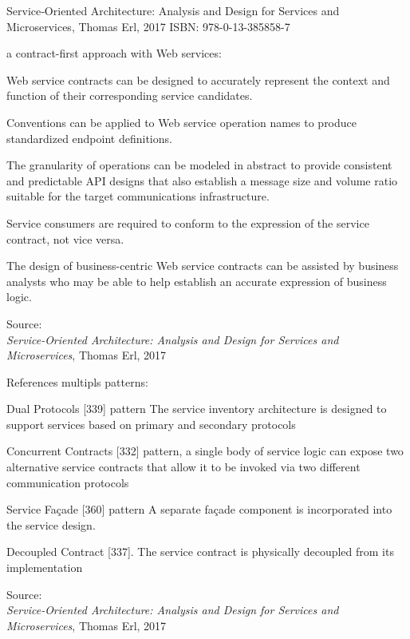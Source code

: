 \documentclass[Screen16to9,17pt]{foils}
\begin{document}
Service‑Oriented Architecture: Analysis and Design for Services and Microservices, Thomas Erl, 2017
ISBN: 978-0-13-385858-7








a contract-first approach with Web services:
\begin{list2}
\item Web service contracts can be designed to accurately represent the context and function of their corresponding service candidates.
\item Conventions can be applied to Web service operation names to produce standardized endpoint definitions.
\item The granularity of operations can be modeled in abstract to provide consistent and predictable API designs that also establish a message size and volume ratio suitable for the target communications infrastructure.
\item Service consumers are required to conform to the expression of the service contract, not vice versa.
\item The design of business-centric Web service contracts can be assisted by business analysts who may be able to help establish an accurate expression of business
logic.
\end{list2}
Source: {\footnotesize\\
\emph{Service‑Oriented Architecture: Analysis and Design for Services and Microservices}, Thomas Erl, 2017}




References multipls patterns:
\begin{list2}
\item Dual Protocols [339] pattern The service inventory architecture is designed to support services based on primary and secondary protocols
\item Concurrent Contracts [332] pattern, a single body of service logic can expose two alternative service contracts that allow it to be invoked via two different communication protocols
\item Service Façade [360] pattern  A separate façade component is incorporated into the service design.
\item Decoupled Contract [337]. The service contract is physically decoupled from its implementation
\end{list2}
Source: {\footnotesize\\
\emph{Service‑Oriented Architecture: Analysis and Design for Services and Microservices}, Thomas Erl, 2017}
\end{document}
